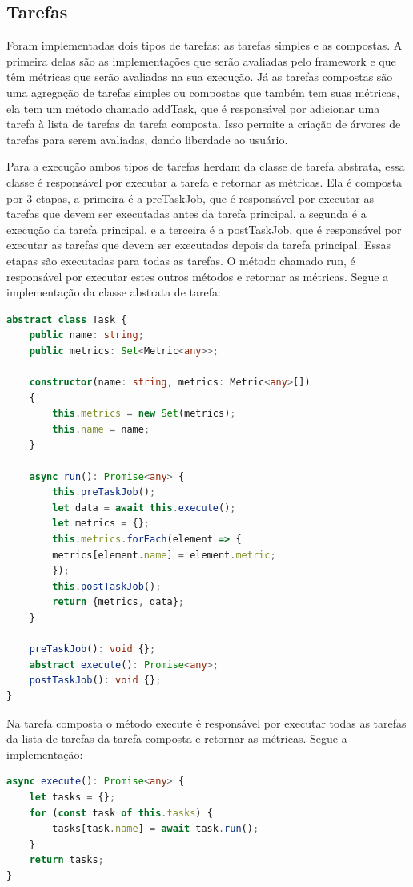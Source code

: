\documentclass[12pt]{tcc}
\begin{document}
\subsection{Tarefas}
Foram implementadas dois tipos de tarefas: as tarefas simples e as compostas.
A primeira delas são as implementações que serão avaliadas pelo framework e que têm métricas que serão avaliadas na sua execução.
Já as tarefas compostas são uma agregação de tarefas simples ou compostas que também tem suas métricas, ela tem um método chamado addTask, que é responsável por adicionar uma tarefa à lista de tarefas da tarefa composta. Isso permite a criação de árvores de tarefas para serem avaliadas, dando liberdade ao usuário.

Para a execução ambos tipos de tarefas herdam da classe de tarefa abstrata, essa classe é responsável por executar a tarefa e retornar as métricas.
Ela é composta por 3 etapas, a primeira é a preTaskJob, que é responsável por executar as tarefas que devem ser executadas antes da tarefa principal, a segunda é a execução da tarefa principal, e a terceira é a postTaskJob, que é responsável por executar as tarefas que devem ser executadas depois da tarefa principal.
Essas etapas são executadas para todas as tarefas.
O método chamado run, é responsável por executar estes outros métodos e retornar as métricas. Segue a implementação da classe abstrata de tarefa:
\begin{lstlisting}[language=TypeScript]
abstract class Task {
	public name: string;
	public metrics: Set<Metric<any>>;
	
	constructor(name: string, metrics: Metric<any>[])
	{
		this.metrics = new Set(metrics);
		this.name = name;
	}
	
	async run(): Promise<any> {
		this.preTaskJob();
		let data = await this.execute();
		let metrics = {};
		this.metrics.forEach(element => {
		metrics[element.name] = element.metric;
		});
		this.postTaskJob();
		return {metrics, data};
	}
	
	preTaskJob(): void {};
	abstract execute(): Promise<any>;
	postTaskJob(): void {};
}
\end{lstlisting}

Na tarefa composta o método execute é responsável por executar todas as tarefas da lista de tarefas da tarefa composta e retornar as métricas. Segue a implementação:
\begin{lstlisting}[language=TypeScript]
async execute(): Promise<any> {
	let tasks = {};
	for (const task of this.tasks) {
		tasks[task.name] = await task.run();
	}
	return tasks;
}
\end{lstlisting}
\end{document}
